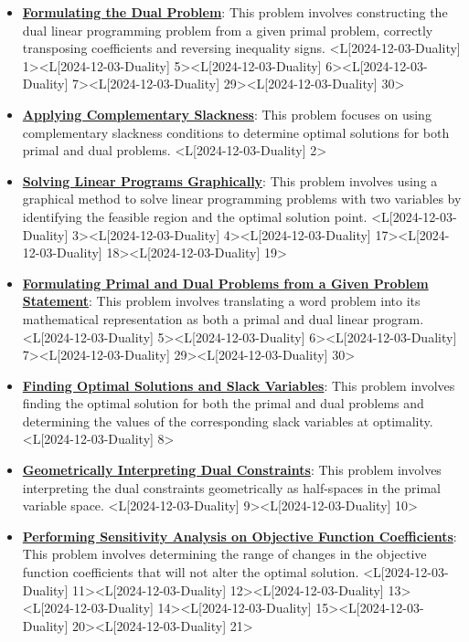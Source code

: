 \documentclass{article}%
\begin{document}
\begin{itemize}[[leftmargin=*]]%
\item \href{https://www.math.purdue.edu/~yipn/421/2024-12-03-Duality.pdf#page=1}{\textbf{Formulating the Dual Problem}}: This problem involves constructing the dual linear programming problem from a given primal problem, correctly transposing coefficients and reversing inequality signs. <L[2024-12-03-Duality] 1><L[2024-12-03-Duality] 5><L[2024-12-03-Duality] 6><L[2024-12-03-Duality] 7><L[2024-12-03-Duality] 29><L[2024-12-03-Duality] 30>%
\item \href{https://www.math.purdue.edu/~yipn/421/2024-12-03-Duality.pdf#page=2}{\textbf{Applying Complementary Slackness}}: This problem focuses on using complementary slackness conditions to determine optimal solutions for both primal and dual problems. <L[2024-12-03-Duality] 2>%
\item \href{https://www.math.purdue.edu/~yipn/421/2024-12-03-Duality.pdf#page=3}{\textbf{Solving Linear Programs Graphically}}: This problem involves using a graphical method to solve linear programming problems with two variables by identifying the feasible region and the optimal solution point. <L[2024-12-03-Duality] 3><L[2024-12-03-Duality] 4><L[2024-12-03-Duality] 17><L[2024-12-03-Duality] 18><L[2024-12-03-Duality] 19>%
\item \href{https://www.math.purdue.edu/~yipn/421/2024-12-03-Duality.pdf#page=5}{\textbf{Formulating Primal and Dual Problems from a Given Problem Statement}}: This problem involves translating a word problem into its mathematical representation as both a primal and dual linear program. <L[2024-12-03-Duality] 5><L[2024-12-03-Duality] 6><L[2024-12-03-Duality] 7><L[2024-12-03-Duality] 29><L[2024-12-03-Duality] 30>%
\item \href{https://www.math.purdue.edu/~yipn/421/2024-12-03-Duality.pdf#page=8}{\textbf{Finding Optimal Solutions and Slack Variables}}: This problem involves finding the optimal solution for both the primal and dual problems and determining the values of the corresponding slack variables at optimality. <L[2024-12-03-Duality] 8>%
\item \href{https://www.math.purdue.edu/~yipn/421/2024-12-03-Duality.pdf#page=9}{\textbf{Geometrically Interpreting Dual Constraints}}: This problem involves interpreting the dual constraints geometrically as half-spaces in the primal variable space. <L[2024-12-03-Duality] 9><L[2024-12-03-Duality] 10>%
\item \href{https://www.math.purdue.edu/~yipn/421/2024-12-03-Duality.pdf#page=11}{\textbf{Performing Sensitivity Analysis on Objective Function Coefficients}}: This problem involves determining the range of changes in the objective function coefficients that will not alter the optimal solution. <L[2024-12-03-Duality] 11><L[2024-12-03-Duality] 12><L[2024-12-03-Duality] 13><L[2024-12-03-Duality] 14><L[2024-12-03-Duality] 15><L[2024-12-03-Duality] 20><L[2024-12-03-Duality] 21>%

\end{itemize}
\end{document}
